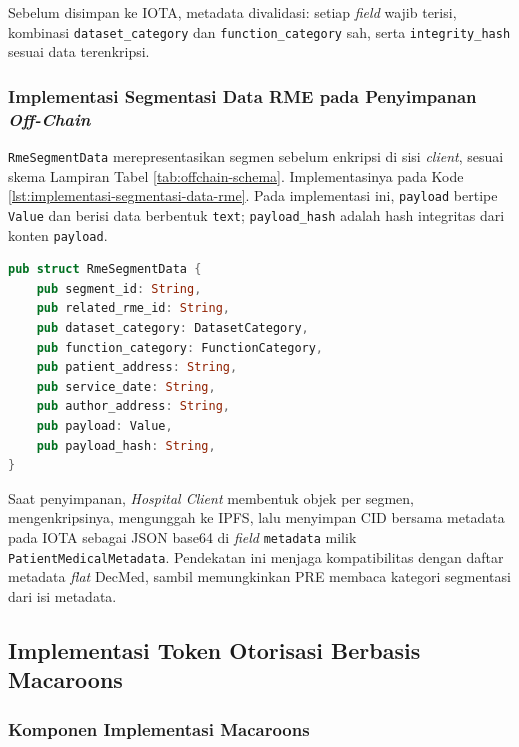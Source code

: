 \documentclass[bahasa, 12pt, a4paper, onecolumn, oneside, final]{report}
\begin{document}
Sebelum disimpan ke IOTA, metadata divalidasi: setiap \textit{field} wajib terisi, kombinasi \texttt{dataset\_category} dan \texttt{function\_category} sah, serta \texttt{integrity\_hash} sesuai data terenkripsi.

\subsubsection{Implementasi Segmentasi Data RME pada Penyimpanan \textit{Off-Chain}}
\label{subsec:implementasi-segmentasi-data-rme-offchain}

\texttt{RmeSegmentData} merepresentasikan segmen sebelum enkripsi di sisi \textit{client}, sesuai skema Lampiran Tabel \ref{tab:offchain-schema}. Implementasinya pada Kode \ref{lst:implementasi-segmentasi-data-rme}. Pada implementasi ini, \texttt{payload} bertipe \texttt{Value} dan berisi data berbentuk \texttt{text}; \texttt{payload\_hash} adalah hash integritas dari konten \texttt{payload}.

\begin{lstlisting}[language=Rust, caption=Implementasi struktur \texttt{RmeSegmentData} pada \textit{crate} \texttt{decmed-rme-segment}, label={lst:implementasi-segmentasi-data-rme}]
pub struct RmeSegmentData {
    pub segment_id: String,
    pub related_rme_id: String,
    pub dataset_category: DatasetCategory,
    pub function_category: FunctionCategory,
    pub patient_address: String,
    pub service_date: String,
    pub author_address: String,
    pub payload: Value,
    pub payload_hash: String,
}
\end{lstlisting}

Saat penyimpanan, \textit{Hospital Client} membentuk objek per segmen, mengenkripsinya, mengunggah ke IPFS, lalu menyimpan CID bersama metadata pada IOTA sebagai JSON base64 di \textit{field} \texttt{metadata} milik \texttt{PatientMedicalMetadata}. Pendekatan ini menjaga kompatibilitas dengan daftar metadata \textit{flat} DecMed, sambil memungkinkan PRE membaca kategori segmentasi dari isi metadata.

\subsection{Implementasi Token Otorisasi Berbasis Macaroons}
\label{subsec:implementasi-token-macaroons}

\subsubsection{Komponen Implementasi Macaroons}
\label{subsubsec:komponen-implementasi-macaroons}
\end{document}
